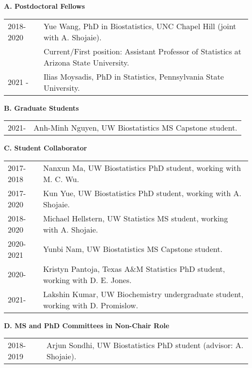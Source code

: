\documentclass[10pt]{article}
\begin{document}
\textbf{A. Postdoctoral Fellows}
\begin{table}[H]
\hskip0.9cm\begin{tabular}{p{1.6cm}p{12cm}}
2018-2020 & Yue Wang, PhD in Biostatistics, UNC Chapel Hill (joint with A. Shojaie).\\
& Current/First position: Assistant Professor of Statistics at Arizona State University.\\
2021 -  & Ilias Moysadis, PhD in Statistics, Pennsylvania State University. 
\end{tabular}
\end{table}

\textbf{B. Graduate Students}

\begin{table}[H]
\hskip0.9cm\begin{tabular}{p{1.6cm}p{12cm}}
2021- & Anh-Minh Nguyen, UW Biostatistics MS Capstone student.
\end{tabular}
\end{table}

\textbf{C. Student Collaborator}
\begin{table}[H]
\hskip0.9cm\begin{tabular}{p{1.6cm}p{12cm}}
2017-2018 & Nanxun Ma, UW Biostatistics PhD student, working with M. C. Wu.\\
2017-2020 & Kun Yue, UW Biostatistics PhD student, working with A. Shojaie.\\
2018-2020 & Michael Hellstern, UW Statistics MS student, working with A. Shojaie. \\
2020-2021 & Yunbi Nam, UW Biostatistics MS Capstone student. \\
2020- & Kristyn Pantoja, Texas A\&M Statistics PhD student, working with D. E. Jones. \\
2021- & Lakshin Kumar, UW Biochemistry undergraduate student, working with D. Promislow.
\end{tabular}
\end{table}

\textbf{D. MS and PhD Committees in Non-Chair Role}
\begin{table}[H]
\hskip0.9cm\begin{tabular}{p{1.6cm}p{12cm}}
2018-2019 & Arjun Sondhi, UW Biostatistics PhD student (advisor: A. Shojaie). 
\end{tabular}
\end{table}
\end{document}
